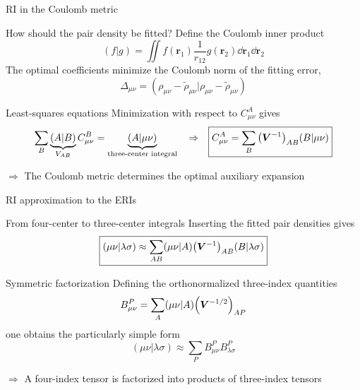 \documentclass[aspectratio=169,9pt]{beamer}
\newcommand{\br}{\boldsymbol{r}}
\newcommand{\bV}{\boldsymbol{V}}
\newcommand{\rbraket}[2]{( #1 | #2 )}
\begin{document}
\begin{frame}{RI in the Coulomb metric}
	\begin{block}{How should the pair density be fitted?}
		Define the Coulomb inner product
		\begin{equation*}
			\rbraket{f}{g}
			=
			\iint
			f(\br_1)
			\frac{1}{r_{12}}
			g(\br_2)
			\dd{\br_1}\dd{\br_2}
		\end{equation*}
		The optimal coefficients minimize the Coulomb norm of the fitting error,
		\begin{equation*}
			\Delta_{\mu\nu}
			=
			\rbraket{
				\rho_{\mu\nu}-\widetilde{\rho}_{\mu\nu}
				}{
				\rho_{\mu\nu}-\widetilde{\rho}_{\mu\nu}
			}
		\end{equation*}
	\end{block}
	\vfill
	\begin{block}{Least-squares equations}
		Minimization with respect to $C_{\mu\nu}^{A}$ gives
		\begin{equation*}
			\sum_B
			\underbrace{\rbraket{A}{B}}_{V_{AB}}
			C_{\mu\nu}^{B}
			=
			\underbrace{\rbraket{A}{\mu\nu}}_{\text{three-center integral}}
			\qq{$\Rightarrow$}
			\boxed{
				C_{\mu\nu}^{A}
				=
				\sum_B
				\qty(\bV^{-1})_{AB}
				\rbraket{B}{\mu\nu}
			}
		\end{equation*}
	\end{block}
	\vfill
	\centering
	$\Rightarrow$
	\alert{The Coulomb metric determines the optimal auxiliary expansion}
\end{frame}



\begin{frame}{RI approximation to the ERIs}
	\begin{block}{From four-center to three-center integrals}
		Inserting the fitted pair densities gives
		\begin{equation*}
			\boxed{
				\rbraket{\mu\nu}{\lambda\sigma}
				\approx
				\sum_{AB}
				\rbraket{\mu\nu}{A}
				\qty(\bV^{-1})_{AB}
				\rbraket{B}{\lambda\sigma}
			}
		\end{equation*}
	\end{block}
	\vfill
	\begin{block}{Symmetric factorization}
		Defining the orthonormalized three-index quantities
		\begin{equation*}
			B_{\mu\nu}^{P}
			=
			\sum_A
			\rbraket{\mu\nu}{A}
			\qty(\bV^{-1/2})_{AP}
		\end{equation*}
		one obtains the particularly simple form
		\begin{equation*}
			\boxed{
				\rbraket{\mu\nu}{\lambda\sigma}
				\approx
				\sum_P
				B_{\mu\nu}^{P}
				B_{\lambda\sigma}^{P}
			}
		\end{equation*}
	\end{block}
	\vfill
	\centering
	$\Rightarrow$
	\alert{A four-index tensor is factorized into products of three-index tensors}
\end{frame}
\end{document}
